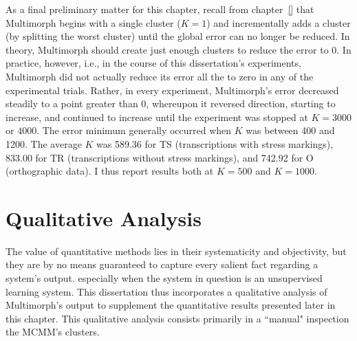 As a final preliminary matter for this chapter, recall from chapter~\ref{}  that Multimorph begins with a single cluster ($K = 1$) 
and incrementally adds a cluster (by splitting the worst cluster) until the global error can no longer be reduced. %
In theory, Multimorph should create just enough clusters to reduce the error
to 0. In practice, however, i.e., in the course of this dissertation's experiments, Multimorph did not actually reduce its error all the to zero in any of the experimental trials. Rather, in every experiment, Multimorph's error decreased steadily to a point greater than 0, whereupon it reversed direction, starting to 
increase, and continued to increase until the experiment was stopped at $K = 3000$ or $4000$.  The error minimum generally occurred when $K$ was between 400 and 1200. 
The average $K$ was 589.36 for TS (transcriptions with stress markings), 833.00 for TR (transcriptions without stress markings), and 742.92 for O (orthographic data). I thus 
report results both at $K = 500$ and $K = 1000$.

\section{Qualitative Analysis}
\label{sec:qual}
The value of quantitative methods lies in their systematicity and objectivity, but
	they are by no means guaranteed to capture every salient fact regarding a system's output. 
	especially when the system in question is an unsupervised learning system. 
	 This dissertation thus incorporates a qualitative analysis of Multimorph's output to supplement the  
	 quantitative results presented later in this chapter.
	This qualitative analysis consists primarily in a ``manual" inspection the MCMM's clusters.
	

